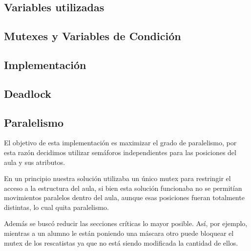 \subsection{Variables utilizadas}


\subsection{Mutexes y Variables de Condición}


\subsection{Implementación}


\subsection{Deadlock}


\subsection{Paralelismo}
El objetivo de esta implementación es maximizar el grado de paralelismo, por esta razón decidimos utilizar semáforos independientes para las posiciones
del aula y sus atributos.

En un principio nuestra solución utilizaba un único mutex para restringir el acceso a la estructura del aula, si bien esta solución funcionaba
no se permitían movimientos paralelos dentro del aula, aunque esas posiciones fueran totalmente distintas, lo cual quita paralelismo.

Además se buscó reducir las secciones críticas lo mayor posible. Así, por ejemplo, mientras a un alumno le están poniendo una máscara otro puede bloquear el mutex
de los rescatistas ya que no está siendo modificada la cantidad de ellos.

